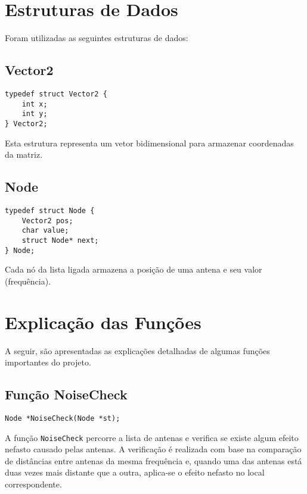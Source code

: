 \documentclass[a4paper,12pt]{article}
\begin{document}
\newpage

\section{Estruturas de Dados}
Foram utilizadas as seguintes estruturas de dados:

\subsection{Vector2}
\begin{lstlisting}[style=CStyle]
typedef struct Vector2 {
    int x;
    int y;
} Vector2;
\end{lstlisting}

Esta estrutura representa um vetor bidimensional para armazenar coordenadas da matriz.

\subsection{Node}
\begin{lstlisting}[style=CStyle]
typedef struct Node {
    Vector2 pos;
    char value;
    struct Node* next;
} Node;
\end{lstlisting}

Cada nó da lista ligada armazena a posição de uma antena e seu valor (frequência).

\newpage

\section{Explicação das Funções}

A seguir, são apresentadas as explicações detalhadas de algumas funções importantes do projeto.

\subsection{Função NoiseCheck}
\begin{lstlisting}[style=CStyle]
Node *NoiseCheck(Node *st);
\end{lstlisting}

A função \texttt{NoiseCheck} percorre a lista de antenas e verifica se existe algum efeito nefasto causado pelas antenas. A verificação é realizada com base na comparação de distâncias entre antenas da mesma frequência e, quando uma das antenas está duas vezes mais distante que a outra, aplica-se o efeito nefasto no local correspondente.
\end{document}
